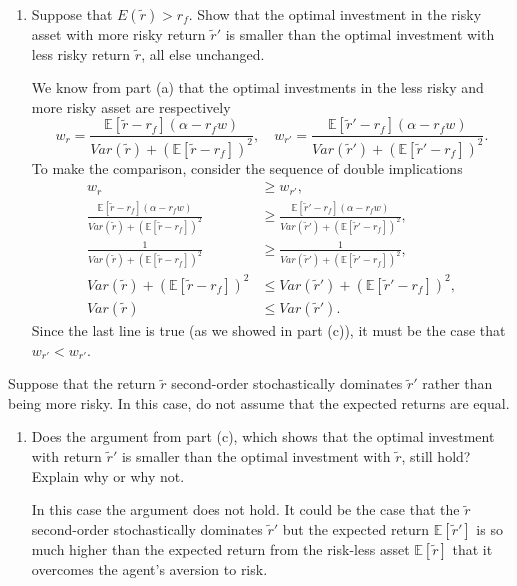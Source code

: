 \documentclass[11pt,english]{article}
\begin{document}
\begin{enumerate}
    \item[(c)] Suppose that $E(\tilde{r}) > r_f$. Show that the optimal
        investment in the risky asset with more risky return $\tilde{r}'$ is
        smaller than the optimal investment with less risky return $\tilde{r}$,
        all else unchanged.
    \begin{solution}
 	We know from part (a) that the optimal investments in the less risky and more risky asset are respectively $$w_r = \frac{\mathbb{E}[\tilde{r} - r_f](\alpha - r_f w)}{Var(\tilde{r}) + \left(\mathbb{E}[\tilde{r} - r_f]\right)^2}, \quad w_{r'} = \frac{\mathbb{E}[\tilde{r}' - r_f](\alpha - r_f w)}{Var(\tilde{r}') + \left(\mathbb{E}[\tilde{r}' - r_f]\right)^2}.$$To make the comparison, consider the sequence of double implications
\begin{align*}
w_r &\geq w_{r'},\\
\frac{\mathbb{E}[\tilde{r} - r_f](\alpha - r_f w)}{Var(\tilde{r}) + \left(\mathbb{E}[\tilde{r} - r_f]\right)^2} &\geq \frac{\mathbb{E}[\tilde{r}' - r_f](\alpha - r_f w)}{Var(\tilde{r}') + \left(\mathbb{E}[\tilde{r}' - r_f]\right)^2},\\
\frac{1}{Var(\tilde{r}) + \left(\mathbb{E}[\tilde{r} - r_f]\right)^2} &\geq \frac{1}{Var(\tilde{r}') + \left(\mathbb{E}[\tilde{r}' - r_f]\right)^2},\\
Var(\tilde{r}) + \left(\mathbb{E}[\tilde{r} - r_f]\right)^2 &\leq Var(\tilde{r}') + \left(\mathbb{E}[\tilde{r}' - r_f]\right)^2,\\
Var(\tilde{r})  &\leq Var(\tilde{r}').
\end{align*}
Since the last line is true (as we showed in part (c)), it must be the case that $w_{r'} < w_{r'}$.
    \end{solution}
\end{enumerate}
 
\noindent Suppose that the return $\tilde{r}$ second-order stochastically dominates
$\tilde{r}'$ rather than being more risky. In this case, do not assume that the
expected returns are equal.
 
\begin{enumerate}
    \item[(d)] Does the argument from part (c), which shows that the optimal
        investment with return $\tilde{r}'$ is smaller than the optimal
        investment with $\tilde{r}$, still hold? Explain why or why not.
    \begin{solution}
 In this case the argument does not hold. It could be the case that the $\tilde{r}$ second-order stochastically dominates $\tilde{r}'$ but the expected return $\mathbb{E}[\tilde{r}']$ is so much higher than the expected return from the risk-less asset $\mathbb{E}[\tilde{r}]$ that it overcomes the agent's aversion to risk.
    \end{solution}
\end{enumerate}
\end{document}
